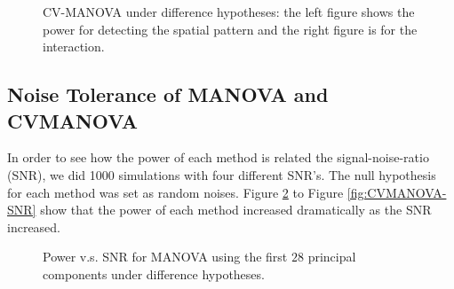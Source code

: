 \documentclass[english]{article}\usepackage[]{graphicx}\usepackage[]{color}
\begin{document}
\begin{figure}[H]
\begin{centering}
\par\end{centering}

\centering{}\protect\caption{CV-MANOVA under difference hypotheses: the left figure shows the power
for detecting the spatial pattern and the right figure is for the
interaction.\label{fig:CVMANOVA-ss}}
\end{figure}



\subsection{Noise Tolerance of MANOVA and CVMANOVA}

In order to see how the power of each method is related the signal-noise-ratio
(SNR), we did 1000 simulations with four different SNR's. The null
hypothesis for each method was set as random noises. Figure \ref{fig:MANOVA-SNR}
to Figure \ref{fig:CVMANOVA-SNR} show that the power of each method
increased dramatically as the SNR increased.

\begin{figure}[H]
\begin{centering}
\par\end{centering}

\centering{}\protect\caption{Power v.s. SNR for MANOVA using the first $28$ principal components
under difference hypotheses.\label{fig:MANOVA-SNR}}
\end{figure}
\end{document}

